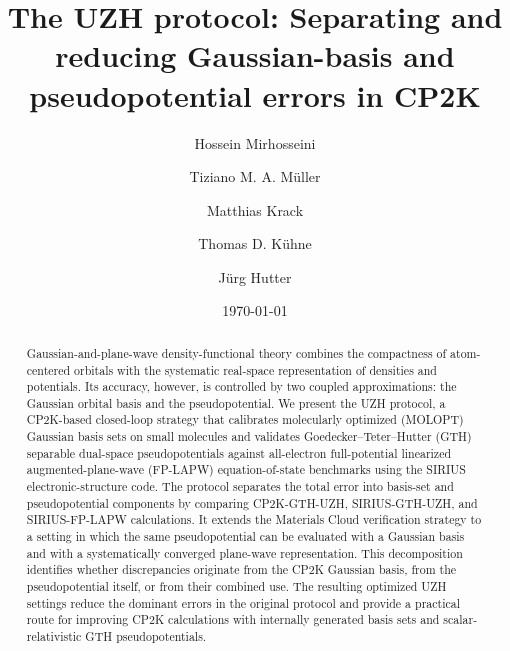 \documentclass[aps,prb,reprint,amsmath,amssymb,superscriptaddress,longbibliography,floatfix]{revtex4-2}
\begin{document}
\title{The UZH protocol: Separating and reducing Gaussian-basis and pseudopotential errors in CP2K}

\author{Hossein Mirhosseini}

\author{Tiziano M. A. M\"uller}

\author{Matthias Krack}

\author{Thomas D. K\"uhne}

\author{J\"urg Hutter}

\date{\today}

\begin{abstract}
Gaussian-and-plane-wave density-functional theory combines the compactness of atom-centered orbitals with the systematic real-space representation of densities and potentials. Its accuracy, however, is controlled by two coupled approximations: the Gaussian orbital basis and the pseudopotential. We present the UZH protocol, a CP2K-based closed-loop strategy that calibrates molecularly optimized (MOLOPT) Gaussian basis sets on small molecules and validates Goedecker--Teter--Hutter (GTH) separable dual-space pseudopotentials against all-electron full-potential linearized augmented-plane-wave (FP-LAPW) equation-of-state benchmarks using the SIRIUS electronic-structure code. The protocol separates the total error into basis-set and pseudopotential components by comparing CP2K-GTH-UZH, SIRIUS-GTH-UZH, and SIRIUS-FP-LAPW calculations. It extends the Materials Cloud verification strategy to a setting in which the same pseudopotential can be evaluated with a Gaussian basis and with a systematically converged plane-wave representation. This decomposition identifies whether discrepancies originate from the CP2K Gaussian basis, from the pseudopotential itself, or from their combined use. The resulting optimized UZH settings reduce the dominant errors in the original protocol and provide a practical route for improving CP2K calculations with internally generated basis sets and scalar-relativistic GTH pseudopotentials.
\end{abstract}
\end{document}
